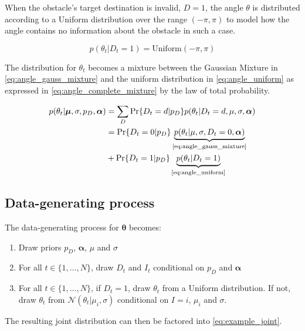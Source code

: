 When the obstacle's target destination is invalid, $D=1$, the angle $\theta$ is distributed according to a Uniform distribution over the range $(-\pi, \pi)$ to model how the angle contains no information about the obstacle in such a case. 

\begin{equation}\label{eq:angle_uniform}
    p(\theta_t | D_t=1) = \text{Uniform}(-\pi, \pi)
\end{equation}

The distribution for $\theta_t$ becomes a mixture between the Gaussian Mixture in \cref{eq:angle_gauss_mixture} and the uniform distribution in  \cref{eq:angle_uniform} as expressed in \cref{eq:angle_complete_mixture} by the law of total probability.

\begin{align}\label{eq:angle_complete_mixture}
\begin{split}
     p(\theta_t | \boldsymbol{\mu}, \sigma, p_D, \boldsymbol{\alpha})
     &= \sum_D \Pr\{D_t=d | p_D\} p(\theta_t | D_t=d, \mu, \sigma, \boldsymbol{\alpha})\\
     &= \Pr\{D_t = 0 | p_D\} \underbrace{p(\theta_t | \mu, \sigma, D_t=0, \boldsymbol{\alpha})}_{\text{\cref{eq:angle_gauss_mixture}}}\\
     &+ \Pr\{D_t=1 | p_D\}\underbrace{p(\theta_t | D_t=1)}_{\text{\cref{eq:angle_uniform}}}
\end{split}
\end{align}

\subsection{Data-generating process}
The data-generating process for $\boldsymbol{\theta}$ becomes:
\begin{enumerate}
    \item Draw priors $p_D$, $\boldsymbol{\alpha}$, $\mu$ and $\sigma$
    \item For all $t \in \{1, \dots, N \}$, draw $D_t$ and $I_t$ conditional on $p_D$ and $\boldsymbol{\alpha}$
    \item For all $t \in \{1, \dots, N\} $, if $D_t=1$, draw $\theta_t$ from a Uniform distribution. If not, draw $\theta_t$ from $\mathcal{N}(\theta_t | \mu_i, \sigma)$ conditional on $I=i$, $\mu_i$ and $\sigma$. 
\end{enumerate}





The resulting joint distribution  can then be factored into \cref{eq:example_joint}.

